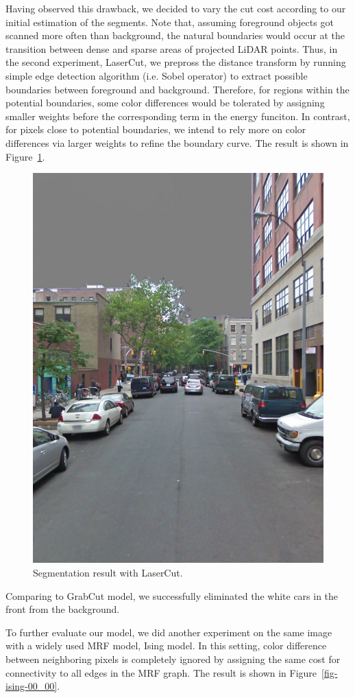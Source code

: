 \documentclass{article} %
\begin{document}
Having observed this drawback, we decided to vary the cut cost according to our initial estimation of the segments. Note that, assuming foreground objects got scanned more often than background, the natural boundaries would occur at the transition between dense and sparse areas of projected LiDAR points. Thus, in the second experiment, LaserCut, we prepross the distance transform by running simple edge detection algorithm (i.e. Sobel operator) to extract possible boundaries between foreground and background. Therefore, for regions within the potential boundaries, some color differences would be tolerated by assigning smaller weights before the corresponding term in the energy funciton. In contrast, for pixels close to potential boundaries, we intend to rely more on color differences via larger weights to refine the boundary curve. The result is shown in Figure~\ref{fig-laser-00_00}.

\begin{figure}[h]
\begin{center}
\includegraphics[height=0.5\linewidth]{./fig/overlay_00_00_laser.jpg}
\end{center}
\caption{Segmentation result with LaserCut.}
\label{fig-laser-00_00}
\end{figure}

Comparing to GrabCut model, we successfully eliminated the white cars in the front from the background.

To further evaluate our model, we did another experiment on the same image with a widely used MRF model, Ising model. In this setting, color difference between neighboring pixels is completely ignored by assigning the same cost for connectivity to all edges in the MRF graph. The result is shown in Figure~\ref{fig-ising-00_00}.
\end{document}
